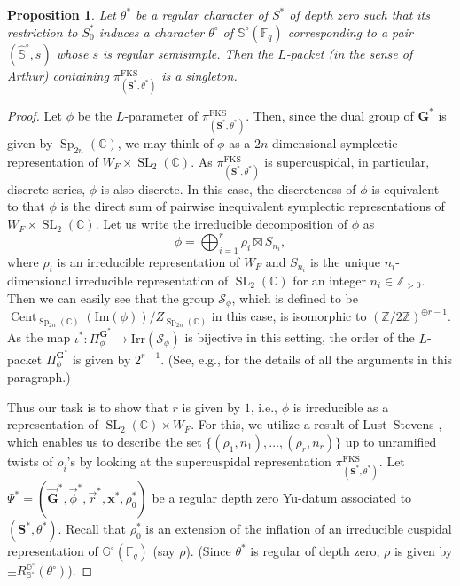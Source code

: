 \documentclass{amsart}
\newcommand{\FKS}{\mathrm{FKS}}
\newcommand{\x}{\mathbf{x}}
\newcommand{\Z}{\mathbb{Z}}
\newcommand{\F}{\mathbb{F}}
\newcommand{\C}{\mathbb{C}}
\newcommand{\bbS}{\mathbb{S}}
\newcommand{\bbG}{\mathbb{G}}
\newcommand{\bfG}{\mathbf{G}}
\newcommand{\bfS}{\mathbf{S}}
\DeclareMathOperator{\Cent}{Cent}
\DeclareMathOperator{\SL}{SL}
\DeclareMathOperator{\Sp}{Sp}
\theoremstyle{plain}
\newtheorem{prop}[thm]{Proposition}
\theoremstyle{definition}
\theoremstyle{remark}
\theoremstyle{theorem}
\begin{document}
\begin{prop}\label{prop:SO singleton}
Let $\theta^{\ast}$ be a regular character of $S^{\ast}$ of depth zero such that its restriction to $S^{\ast}_{0}$ induces a character $\theta^{\circ}$ of $\bbS^{\circ}(\F_{q})$ corresponding to a pair $(\hat{\bbS}^{\circ},s)$ whose $s$ is regular semisimple.
Then the $L$-packet (in the sense of Arthur) containing $\pi^{\FKS}_{(\bfS^{\ast},\theta^{\ast})}$ is a singleton.
\end{prop}

\begin{proof}
Let $\phi$ be the $L$-parameter of $\pi^{\FKS}_{(\bfS^{\ast},\theta^{\ast})}$.
Then, since the dual group of $\bfG^{\ast}$ is given by $\Sp_{2n}(\C)$, we may think of $\phi$ as a $2n$-dimensional symplectic representation of $W_{F}\times\SL_{2}(\C)$.
As $\pi^{\FKS}_{(\bfS^{\ast},\theta^{\ast})}$ is supercuspidal, in particular, discrete series, $\phi$ is also discrete.
In this case, the discreteness of $\phi$ is equivalent to that $\phi$ is the direct sum of pairwise inequivalent symplectic representations of $W_{F}\times\SL_{2}(\C)$.
Let us write the irreducible decomposition of $\phi$ as
\[
\phi=\bigoplus_{i=1}^{r} \rho_{i}\boxtimes S_{n_{i}},
\]
where $\rho_{i}$ is an irreducible representation of $W_{F}$ and $S_{n_{i}}$ is the unique $n_{i}$-dimensional irreducible representation of $\SL_{2}(\C)$ for an integer $n_{i}\in\Z_{>0}$.
Then we can easily see that the group $\mathcal{S}_{\phi}$, which is defined to be $\Cent_{\Sp_{2n}(\C)}(\mathrm{Im}(\phi))/Z_{\Sp_{2n}(\C)}$ in this case, is isomorphic to $(\Z/2\Z)^{\oplus r-1}$.
As the map $\iota^{\ast}\colon\Pi^{\bfG^{\ast}}_{\phi}\rightarrow \mathrm{Irr}(\mathcal{S}_{\phi})$ is bijective in this setting, the order of the $L$-packet $\Pi^{\bfG^{\ast}}_{\phi}$ is given by $2^{r-1}$.
(See, e.g., \cite[Section 2]{Xu17-MM} for the details of all the arguments in this paragraph.)

Thus our task is to show that $r$ is given by $1$, i.e., $\phi$ is irreducible as a representation of $\SL_{2}(\C)\times W_{F}$.
For this, we utilize a result of Lust--Stevens \cite{LS20}, which enables us to describe the set $\{(\rho_{1},n_{1}),\ldots,(\rho_{r},n_{r})\}$ up to unramified twists of $\rho_{i}$'s by looking at the supercuspidal representation $\pi^{\FKS}_{(\bfS^{\ast},\theta^{\ast})}$.
Let $\Psi^{\ast}=(\vec{\bfG}^{\ast},\vec{\phi}^{\ast},\vec{r}^{\ast},\x^{\ast},\rho^{\ast}_{0})$ be a regular depth zero Yu-datum associated to $(\bfS^{\ast},\theta^{\ast})$.
Recall that $\rho^{\ast}_{0}$ is an extension of the inflation of an irreducible cuspidal representation of $\bbG^{\circ}(\F_{q})$ (say $\rho$).
(Since $\theta^{\ast}$ is regular of depth zero, $\rho$ is given by $\pm R_{\bbS^{\circ}}^{\bbG^{\circ}}(\theta^{\circ})$).


\end{proof}
\end{document}
